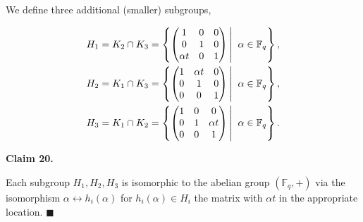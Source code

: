 \documentclass[10pt,a4paper]{article}
\begin{document}
We define three additional (smaller) subgroups,\par


\[\begin{gathered}
\displaystyle H_{1}=K_{2}\cap K_{3}=\left\{\begin{pmatrix}1&0&0\\
0&1&0\\
\alpha t&0&1\end{pmatrix}\left|\;\vphantom{\begin{pmatrix}1&0&0\\
0&1&0\\
\alpha t&0&1\end{pmatrix}\alpha\in\mathbb{F}_{q}}\right.\alpha\in\mathbb{F}_{q}\right\}, \\
\displaystyle H_{2}=K_{1}\cap K_{3}=\left\{\begin{pmatrix}1&\alpha t&0\\
0&1&0\\
0&0&1\end{pmatrix}\left|\;\vphantom{\begin{pmatrix}1&\alpha t&0\\
0&1&0\\
0&0&1\end{pmatrix}\alpha\in\mathbb{F}_{q}}\right.\alpha\in\mathbb{F}_{q}\right\}, \\
\displaystyle H_{3}=K_{1}\cap K_{2}=\left\{\begin{pmatrix}1&0&0\\
0&1&\alpha t\\
0&0&1\end{pmatrix}\left|\;\vphantom{\begin{pmatrix}1&0&0\\
0&1&\alpha t\\
0&0&1\end{pmatrix}\alpha\in\mathbb{F}_{q}}\right.\alpha\in\mathbb{F}_{q}\right\}.
\end{gathered}\]





\par\medskip\noindent\textbf{
Claim 20. 
}\par



Each subgroup $H_{1},H_{2},H_{3}$ is isomorphic to the abelian group $(\mathbb{F}_{q},+)$ via the isomorphism $\alpha\leftrightarrow h_{i}(\alpha)$ for
$h_{i}(\alpha)\in H_{i}$ the matrix with $\alpha t$ in the appropriate location. \ensuremath{\blacksquare}\par
\end{document}
